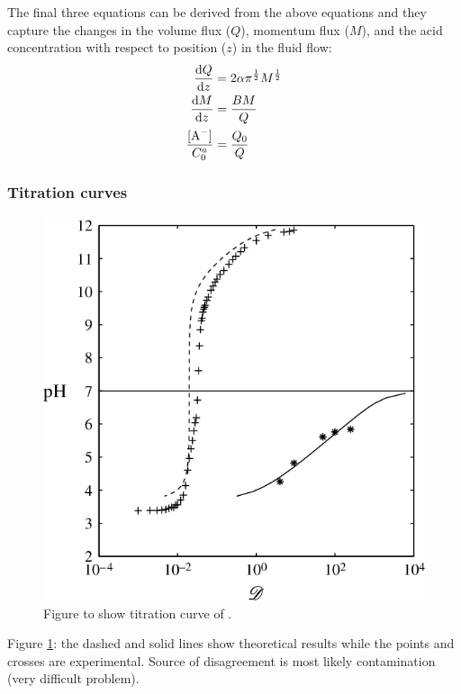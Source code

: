 The final three equations can be derived from the above equations and they capture the changes in the volume flux ($Q$), momentum flux ($M$), and the acid concentration with respect to position ($z$) in the fluid flow:
\begin{align}
    \frac{\dif Q}{\dif z}    & = 2\alpha \pi^{\frac{1}{2}} M^{\frac{1}{2}} \\
    \frac{\dif M}{\dif z}    & = \frac{BM}{Q}                              \\
    \frac{[\ce{A^-}]}{C^a_0} & = \frac{Q_0}{Q}
\end{align}
\subsubsection{Titration curves}
\begin{figure}[htbp]
    \centering
    \includegraphics[width = 0.5 \textwidth]{./img/figure81.png}
    \caption{Figure to show titration curve of .}
    \label{titration}
\end{figure}
Figure \ref{titration}: the dashed and solid lines show theoretical results while the points and crosses are experimental. Source of disagreement is most likely contamination (very difficult problem).
